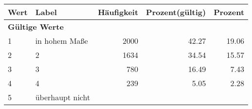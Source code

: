      \begin{longtable}{lXrrr}
     \toprule
     \textbf{Wert} & \textbf{Label} & \textbf{Häufigkeit} & \textbf{Prozent(gültig)} & \textbf{Prozent} \\
     \endhead
     \midrule
     \multicolumn{5}{l}{\textbf{Gültige Werte}}\\

     1 &
     \multicolumn{1}{X}{ in hohem Maße   } &


       \num{2000} &
       \num[round-mode=places,round-precision=2]{42.27} &
         \num[round-mode=places,round-precision=2]{19.06} \\

     2 &
     \multicolumn{1}{X}{ 2   } &


       \num{1634} &
       \num[round-mode=places,round-precision=2]{34.54} &
         \num[round-mode=places,round-precision=2]{15.57} \\

     3 &
     \multicolumn{1}{X}{ 3   } &


       \num{780} &
       \num[round-mode=places,round-precision=2]{16.49} &
         \num[round-mode=places,round-precision=2]{7.43} \\

     4 &
     \multicolumn{1}{X}{ 4   } &


       \num{239} &
       \num[round-mode=places,round-precision=2]{5.05} &
         \num[round-mode=places,round-precision=2]{2.28} \\

     5 &
     \multicolumn{1}{X}{ überhaupt nicht   } &



\end{longtable}
